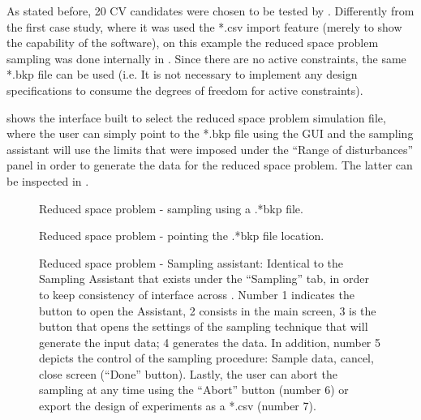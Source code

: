 \documentclass[../../msc-thesis.tex]{subfiles}
\begin{document}
As stated before, 20 CV candidates were chosen to be tested by \mtc. 
Differently from the first case study, where it was used the *.csv import 
feature (merely to show the capability of the software), on this example the 
reduced space problem sampling was done internally in \mtc. 
Since there are no active constraints, the same *.bkp file can be used (i.e. It 
is not necessary to implement any design specifications to consume the degrees 
of freedom for active constraints). 

 shows the 
interface built to select the reduced space problem simulation file, where the 
user can simply point to the *.bkp file using the GUI and the sampling assistant 
will use the limits that were imposed under the ``Range of disturbances'' panel 
in order to generate the data for the reduced space problem. The latter can be 
inspected in .

\begin{figure}[htb]
    \centering
    \caption{Reduced space problem - sampling using a .*bkp file.}
    \label{fig:c3splitterredspace}
\end{figure}

\begin{figure}[htb]
    \centering
    \caption{Reduced space problem - pointing the .*bkp file location.}
    \label{fig:c3splitterredspace-file}
\end{figure}

\begin{figure}[htb]
    \centering
    \caption{Reduced space problem - Sampling assistant: Identical to the 
    Sampling Assistant that exists under the ``Sampling'' tab, in order to keep 
    consistency of interface across \mtc. Number 1 indicates the button to 
    open the Assistant, 2 consists in the main screen, 3 is the button that 
    opens the settings of the sampling technique that will generate the input 
    data; 4 generates the data. In addition, number 5 depicts the control of 
    the sampling procedure: Sample data, cancel, close screen (``Done'' 
    button). Lastly, the user can abort the sampling at any time using the 
    ``Abort'' button (number 6) or export the design of experiments as a 
    *.csv (number 7).}
    \label{fig:c3splitterredspace-file}
\end{figure}
\end{document}
